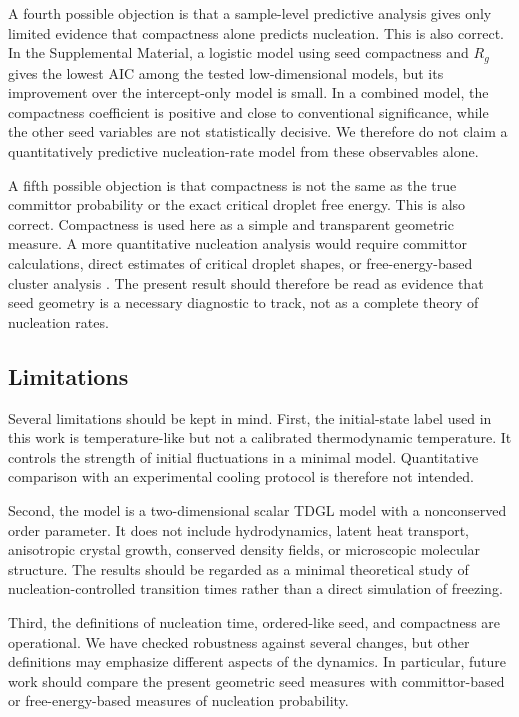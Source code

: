 ﻿\documentclass[aps,pre,preprint,showkeys,amsmath,amssymb,superscriptaddress,longbibliography]{revtex4-2}
\begin{document}
A fourth possible objection is that a sample-level predictive analysis gives only limited evidence that compactness alone predicts nucleation. This is also correct. In the Supplemental Material, a logistic model using seed compactness and $R_g$ gives the lowest AIC among the tested low-dimensional models, but its improvement over the intercept-only model is small. In a combined model, the compactness coefficient is positive and close to conventional significance, while the other seed variables are not statistically decisive. We therefore do not claim a quantitatively predictive nucleation-rate model from these observables alone.

A fifth possible objection is that compactness is not the same as the true committor probability or the exact critical droplet free energy. This is also correct. Compactness is used here as a simple and transparent geometric measure. A more quantitative nucleation analysis would require committor calculations, direct estimates of critical droplet shapes, or free-energy-based cluster analysis \cite{DellagoBolhuisChandler1998,BolhuisDellagoChandlerGeissler2002,WeinanRenVandenEijnden2005}. The present result should therefore be read as evidence that seed geometry is a necessary diagnostic to track, not as a complete theory of nucleation rates.

\subsection{Limitations}\label{limitations}

Several limitations should be kept in mind. First, the initial-state label used in this work is temperature-like but not a calibrated thermodynamic temperature. It controls the strength of initial fluctuations in a minimal model. Quantitative comparison with an experimental cooling protocol is therefore not intended.

Second, the model is a two-dimensional scalar TDGL model with a nonconserved order parameter. It does not include hydrodynamics, latent heat transport, anisotropic crystal growth, conserved density fields, or microscopic molecular structure. The results should be regarded as a minimal theoretical study of nucleation-controlled transition times rather than a direct simulation of freezing.

Third, the definitions of nucleation time, ordered-like seed, and compactness are operational. We have checked robustness against several changes, but other definitions may emphasize different aspects of the dynamics. In particular, future work should compare the present geometric seed measures with committor-based or free-energy-based measures of nucleation probability.
\end{document}
